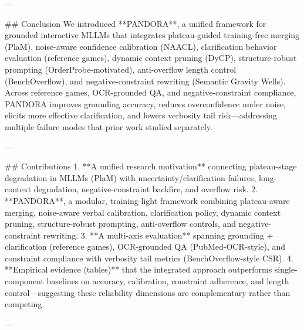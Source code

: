 ---

## Conclusion  
We introduced **PANDORA**, a unified framework for grounded interactive MLLMs that integrates plateau-guided training-free merging (PlaM), noise-aware confidence calibration (NAACL), clarification behavior evaluation (reference games), dynamic context pruning (DyCP), structure-robust prompting (OrderProbe-motivated), anti-overflow length control (BenchOverflow), and negative-constraint rewriting (Semantic Gravity Wells). Across reference games, OCR-grounded QA, and negative-constraint compliance, PANDORA improves grounding accuracy, reduces overconfidence under noise, elicits more effective clarification, and lowers verbosity tail risk—addressing multiple failure modes that prior work studied separately.

---

## Contributions  
1. **A unified research motivation** connecting plateau-stage degradation in MLLMs (PlaM) with uncertainty/clarification failures, long-context degradation, negative-constraint backfire, and overflow risk.  
2. **PANDORA**, a modular, training-light framework combining plateau-aware merging, noise-aware verbal calibration, clarification policy, dynamic context pruning, structure-robust prompting, anti-overflow controls, and negative-constraint rewriting.  
3. **A multi-axis evaluation** spanning grounding + clarification (reference games), OCR-grounded QA (PubMed-OCR-style), and constraint compliance with verbosity tail metrics (BenchOverflow-style CSR).  
4. **Empirical evidence (tables)** that the integrated approach outperforms single-component baselines on accuracy, calibration, constraint adherence, and length control—suggesting these reliability dimensions are complementary rather than competing.

---